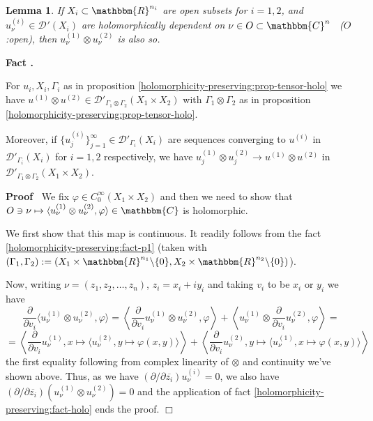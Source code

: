 \documentclass{article}
\newcommand{\assign}{:=}
\newcommand{\tmtextbf}[1]{{\bfseries{#1}}}
\newcommand{\tmtextit}[1]{{\itshape{#1}}}
\newcommand{\tmtextup}[1]{{\upshape{#1}}}
\newenvironment{proof}{\noindent\textbf{Proof\ }}{\hspace*{\fill}$\Box$\medskip}
\numberwithin{definition}{section}
\newtheorem{lemma}{Lemma}
\numberwithin{lemma}{section}
\numberwithin{proposition}{section}
{\theorembodyfont{\rmfamily}\newtheorem{remark}{Remark}
\numberwithin{remark}{section}
}
\begin{document}
\begin{lemma}
  \label{holomorphicity-preserving:lem-tensor-holo}If $X_i \subset
  \mathbbm{R}^{n_i}$ are open subsets for $i = 1, 2$, and $u^{( i)}_{\nu} \in
  \mathcal{D}_{}' ( X_i)$ are holomorphically dependent on $\nu \in O \subset
  \mathbbm{C}^n$ \ ($O$:open), then $u_{\nu}^{( 1)} \otimes u^{( 2)}_{\nu}$ is
  also so.
\end{lemma}

{\noindent}\tmtextbf{Fact \tmtextup{7}.
}\tmtextit{\label{holomorphicity-preserving:fact-p1}{\cite[p. 511, rmk.
2.5]{chazarain2011introduction}} For $u_i,X_i, \Gamma_i$ as in proposition
\ref{holomorphicity-preserving:prop-tensor-holo} we have $u^{( 1)} \otimes
u^{( 2)} \in \mathcal{D}'_{\Gamma_1 \otimes \Gamma_2} ( X_1 \times X_2)$ with
$\Gamma_1 \otimes \Gamma_2$ as in proposition
\ref{holomorphicity-preserving:prop-tensor-holo}.

Moreover, if $\{ u_j^{( i)} \}_{j = 1}^{\infty} \in \mathcal{D}'_{\Gamma_i} (
X_i)$ are sequences converging to $u^{( i)}$ in $\mathcal{D}'_{\Gamma_i} (
X_i)$ for $i = 1, 2$ respectively, we have $u_j^{( 1)} \otimes u_j^{( 2)}
\rightarrow u^{( 1)} \otimes u^{( 2)}$ in $\mathcal{D}'_{\Gamma_1 \otimes
\Gamma_2} ( X_1 \times X_2)$.}{\hspace*{\fill}}{\medskip}

\begin{proof}
  We fix $\varphi \in C^{\infty}_0 ( X_1 \times X_2)$ and then we need to show
  that $O \ni \nu \mapsto \langle u_{\nu}^{( 1)} \otimes u_{\nu}^{( 2)},
  \varphi \rangle \in \mathbbm{C}$ is holomorphic.
  
  We first show that this map is continuous. It readily follows from the fact
  \ref{holomorphicity-preserving:fact-p1} (taken with $( \Gamma_1, \Gamma_2)
  \assign ( X_1 \times \mathbbm{R}^{n_1} \backslash \{ 0 \}, X_2 \times
  \mathbbm{R}^{n_2} \backslash \{ 0 \})$).
  
  Now, writing $\nu = ( z_1, z_2, \ldots, z_n)$, $z_i = x_i + i y_i$ and
  taking $v_i$ to be $x_i$ or $y_i$ we have
  \[ \frac{\partial}{\partial v_i} \langle u_{\nu_{}}^{( 1)} \otimes
     u_{\nu_{}}^{( 2)}, \varphi \rangle = \left\langle
     \frac{\partial}{\partial v_i} u_{\nu_{}}^{( 1)} \otimes u_{\nu_{}}^{(
     2)}, \varphi \right\rangle + \left\langle u_{\nu_{}}^{( 1)} \otimes
     \frac{\partial}{\partial v_i} u_{\nu_{}}^{( 2)}, \varphi \right\rangle =
  \]
  \[ = \left\langle \frac{\partial}{\partial v_i} u_{\nu_{}}^{( 1)}, x \mapsto
     \langle u_{\nu_{}}^{( 2)}, y \mapsto \varphi ( x, y) \rangle
     \right\rangle + \left\langle \frac{\partial}{\partial v_i} u_{\nu_{}}^{(
     2)}, y \mapsto \langle u_{\nu_{}}^{( 1)}, x \mapsto \varphi ( x, y)
     \rangle \right\rangle \]
  the first equality following from complex linearity of $\otimes$ and
  continuity we've shown above. Thus, as we have $\left( \partial / \partial
  \overline{z_i} \right) u_{\nu}^{( i)} = 0$, we also have $\left( \partial /
  \partial \overline{z_i} \right) ( u_{\nu}^{( 1)} \otimes u_{\nu}^{( 2)}) =
  0$ and the application of fact \ref{holomorphicity-preserving:fact-holo}
  ends the proof.
\end{proof}
\end{document}
